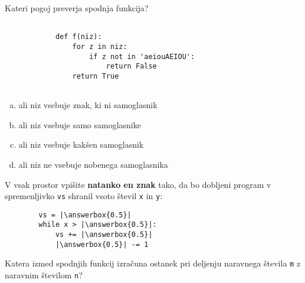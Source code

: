 \documentclass[arhiv, 10pt]{../izpit}
\newcommand{\inlinepy}[1]{\texttt{#1}}
\newcommand{\answerbox}[1]{\framebox{\vphantom{\large M}\hspace{#1cm}}}
\begin{document}
        \naloga*

        \begin{multicols}{2}
        \noindent
        Kateri pogoj preverja spodnja funkcija?
        \begin{verbatim}
        
            def f(niz):
                for z in niz:
                    if z not in 'aeiouAEIOU':
                        return False
                return True
            
        \end{verbatim}

        \begin{enumerate}[(a)]
\item ali niz vsebuje znak, ki ni samoglasnik
\item ali niz vsebuje samo samoglasnike
\item ali niz vsebuje kakšen samoglasnik
\item ali niz ne vsebuje nobenega samoglasnika
\end{enumerate}

        \end{multicols}
    
        \naloga*
        \begin{multicols}{2}
        \noindent
        V vsak prostor vpišite \textbf{natanko en znak} tako, da bo dobljeni program v spremenljivko \inlinepy{vs} shranil vsoto števil \inlinepy{x} in \inlinepy{y}:
        
        \columnbreak
        \begin{verbatim}
        vs = |\answerbox{0.5}|
        while x > |\answerbox{0.5}|:
            vs += |\answerbox{0.5}|
            |\answerbox{0.5}| -= 1
        \end{verbatim}
        \end{multicols}
    
        \clearpage
        \naloga
        
        Katera izmed spodnjih funkcij izračuna ostanek pri deljenju naravnega števila \inlinepy{m} z naravnim številom \inlinepy{n}?
    
\end{document}

